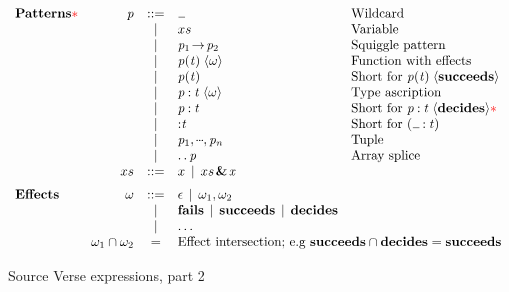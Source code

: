 \begin{figure}
$$
\begin{array}{lrcll}
  \text{\bf Patterns} \asktim & \ensuremath{\Varid{p}} & ::= & \ensuremath{\anonymous }   & \text{Wildcard} \\
  & & \vb & \ensuremath{ xs }                         & \text{Variable} \\
  & & \vb & \ensuremath{\Varid{p}_{\mathrm{1}}\!\rightarrow\!\Varid{p}_{\mathrm{2}}}               & \text{Squiggle pattern} \\
  & & \vb & \ensuremath{\Varid{p}(\Varid{t})\;\langle\omega\rangle}       & \text{Function with effects} \\
  & & \vb & \ensuremath{\Varid{p}(\Varid{t})}              & \text{Short for \ensuremath{\Varid{p}(\Varid{t})\;\langle\textbf{succeeds}\rangle} } \\
  & & \vb & \ensuremath{\Varid{p}\mathbin{:}\Varid{t}\;\langle\omega\rangle}              & \text{Type ascription}\\
  & & \vb & \ensuremath{\Varid{p}\mathbin{:}\Varid{t}}                       & \text{Short for \ensuremath{\Varid{p}\mathbin{:}\Varid{t}\;\langle\textbf{decides}\rangle}}\asktim\\
  & & \vb & \ensuremath{\mathbin{:}\Varid{t}} & \text{Short for \ensuremath{(\anonymous \mathbin{:}\Varid{t})}} \\
  & & \vb & \ensuremath{\Varid{p}_{\mathrm{1}},\mydots,\Varid{p}_{\Varid{n}}}  & \text{Tuple} \\
  & & \vb & \ensuremath{\mathinner{\ldotp\ldotp}\Varid{p}} & \text{Array splice} \\
& \ensuremath{ xs } & ::= & x \vb  \ensuremath{ xs \;\!\textbf{\&}\!\;\Varid{x}}
\\[2mm]
\text{\bf Effects} &
\ensuremath{\omega} & ::= & \ensuremath{\epsilon} \vb \ensuremath{\omega_{\mathrm{1}},\omega_{\mathrm{2}}} \\
&     & \vb & \ensuremath{\textbf{fails}}  \vb \ensuremath{\textbf{succeeds}} \vb \ensuremath{\textbf{decides}} \\
&     & \vb & \ldots \\

& \ensuremath{\omega_{\mathrm{1}}\cap\omega_{\mathrm{2}}} & = & \multicolumn{2}{l}{\text{Effect intersection; e.g \ensuremath{\textbf{succeeds}\cap\textbf{decides}\mathrel{=}\textbf{succeeds}}}}

\end{array}
$$
\caption{Source Verse expressions, part 2} \label{fig:source-verse-expr2}
\end{figure}

